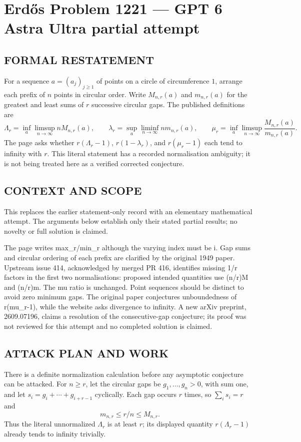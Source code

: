 \section*{Erd\H{o}s Problem 1221 --- GPT 6 Astra Ultra partial attempt}


\subsection*{FORMAL RESTATEMENT}
For a sequence $a=(a_j)_{j\geq1}$ of points on a circle of circumference $1$, arrange each prefix of $n$ points in circular order. Write $M_{n,r}(a)$ and $m_{n,r}(a)$ for the greatest and least sums of $r$ successive circular gaps. The published definitions are
\[\Lambda_r=\inf_a\limsup_{n\to\infty}nM_{n,r}(a),\qquad
\lambda_r=\sup_a\liminf_{n\to\infty}nm_{n,r}(a),\qquad
\mu_r=\inf_a\limsup_{n\to\infty}\frac{M_{n,r}(a)}{m_{n,r}(a)}.\]
The page asks whether $r(\Lambda_r-1)$, $r(1-\lambda_r)$, and $r(\mu_r-1)$ each tend to infinity with $r$. This literal statement has a recorded normalisation ambiguity; it is not being treated here as a verified corrected conjecture.

\subsection*{CONTEXT AND SCOPE}
This replaces the earlier statement-only record with an elementary mathematical attempt. The arguments below establish only their stated partial results; no novelty or full solution is claimed.

The page writes max_r/min_r although the varying index must be i. Gap sums and circular ordering of each prefix are clarified by the original 1949 paper. Upstream issue 414, acknowledged by merged PR 416, identifies missing 1/r factors in the first two normalisations: proposed intended quantities use (n/r)M and (n/r)m. The mu ratio is unchanged. Point sequences should be distinct to avoid zero minimum gaps. The original paper conjectures unboundedness of r(mu_r-1), while the website asks divergence to infinity. A new arXiv preprint, 2609.07196, claims a resolution of the consecutive-gap conjecture; its proof was not reviewed for this attempt and no completed solution is claimed.

\subsection*{ATTACK PLAN AND WORK}
There is a definite normalization calculation before any asymptotic conjecture
can be attacked. For $n\ge r$, let the circular gaps be $g_1,\ldots,g_n>0$,
with sum one, and let $s_i=g_i+\cdots+g_{i+r-1}$ cyclically.
Each gap occurs $r$ times, so $\sum_i s_i=r$ and
\[m_{n,r}\le r/n\le M_{n,r}.\tag{1}\]
Thus the literal unnormalized $\Lambda_r$ is at least $r$; its displayed
quantity $r(\Lambda_r-1)$ already tends to infinity trivially.

